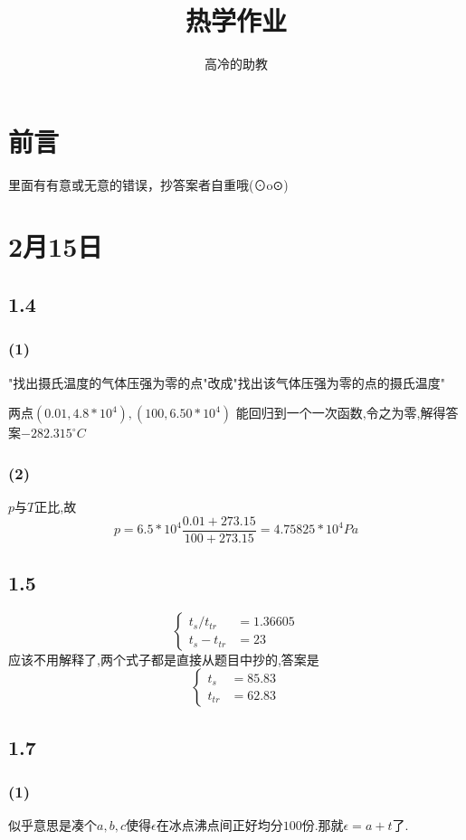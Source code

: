 \documentclass{article}
\title{热学作业}
\author{高冷的助教}
\begin{document}
\maketitle
\section*{前言}
里面有有意或无意的错误，抄答案者自重哦(⊙o⊙)
\section{2月15日}
\subsection*{1.4}
\subsubsection*{(1)}
"找出摄氏温度的气体压强为零的点"改成"找出该气体压强为零的点的摄氏温度"

两点$(0.01, 4.8*10^4), (100, 6.50*10^4)$
能回归到一个一次函数,令之为零,解得答案$-282.315^{\circ}C$

\subsubsection*{(2)}
$p$与$T$正比,故
\begin{equation}
p=6.5*10^4 \frac{0.01 + 273.15}{100 + 273.15}=4.75825*10^4 Pa
\end{equation}
\subsection*{1.5}
\begin{equation}
	\left\{\begin{aligned}
	t_s/t_{tr}&=1.36605\\
	t_s-t_{tr}&=23
	\end{aligned}\right.
\end{equation}
应该不用解释了,两个式子都是直接从题目中抄的,答案是
\begin{equation}
\left\{\begin{aligned}
t_s &= 85.83\\
t_{tr}&=62.83
\end{aligned}\right.
\end{equation}
\subsection*{1.7}
\subsubsection*{(1)}
似乎意思是凑个$a,b,c$使得$\epsilon$在冰点沸点间正好均分$100$份.那就$\epsilon=a+t$了.
\end{document}
